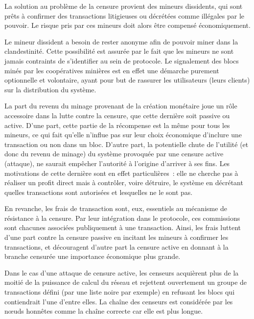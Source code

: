 La solution au problème de la censure provient des mineurs dissidents, qui sont prêts à confirmer des transactions litigieuses ou décrétées comme illégales par le pouvoir. Le risque pris par ces mineurs doit alors être compensé économiquement.

Le mineur dissident a besoin de rester anonyme afin de pouvoir miner dans la clandestinité. Cette possibilité est assurée par le fait que les mineurs ne sont jamais contraints de s'identifier au sein de protocole. Le signalement des blocs minés par les coopératives minières est en effet une démarche purement optionnelle et volontaire, ayant pour but de rassurer les utilisateurs (leurs clients) sur la distribution du système.

La part du revenu du minage provenant de la création monétaire joue un rôle accessoire dans la lutte contre la censure, que cette dernière soit passive ou active. D'une part, cette partie de la récompense est la même pour tous les mineurs, ce qui fait qu'elle n'influe pas sur leur choix économique d'inclure une transaction ou non dans un bloc. D'autre part, la potentielle chute de l'utilité (et donc du revenu de minage) du système provoquée par une censure active (attaque), ne saurait empêcher l'autorité à l'origine d'arriver à ses fins. Les motivations de cette dernière sont en effet particulières~: elle ne cherche pas à réaliser un profit direct mais à contrôler, voire détruire, le système en décrétant quelles transactions sont autorisées et lesquelles ne le sont pas.

En revanche, les frais de transaction sont, eux, essentiels au mécanisme de résistance à la censure. Par leur intégration dans le protocole, ces commissions sont chacunes associées publiquement à une transaction. Ainsi, les frais luttent d'une part contre la censure passive en incitant les mineurs à confirmer les transactions, et découragent d'autre part la censure active en donnant à la branche censurée une importance économique plus grande.


Dans le cas d'une attaque de censure active, les censeurs acquièrent plus de la moitié de la puissance de calcul du réseau et rejettent ouvertement un groupe de transactions défini (par une liste noire par exemple) en refusant les blocs qui contiendrait l'une d'entre elles. La chaîne des censeurs est considérée par les nœuds honnêtes comme la chaîne correcte car elle est plus longue.


